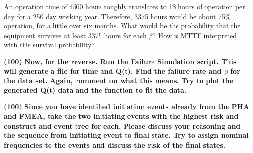 \documentclass[11pt,a4paper]{article}
\begin{document}
\begin{enumerate}[leftmargin=*,topsep=0pt,font=\bfseries]
{        \vspace{0.05in}
    \item[]
        An operation time of 4500 hours roughly translates to 18 hours of operation per day for a 250 day working year. Therefore, 3375 hours would be about 75\% operation, for a little over six months. What would be the probability that the equipment survives at least 3375 hours for each $\beta$? How is MTTF interpreted with this survival probability?}
        \vspace{\baselineskip}
        \newpage
    \item\textbf{(100) Now, for the reverse. Run the \href{https://github.com/TheDoctorRAB/education/tree/master/src}{Failure Simulation} script. This will generate a file for time and Q(t). Find the failure rate and $\beta$ for the data set. Again, comment on what this means. Try to plot the generated Q(t) data and the function to fit the data.}
        \vspace{\baselineskip}


























        \newpage
    \item\textbf{(100) Since you have identified initiating events already from the PHA and FMEA, take the two initiating events with the highest risk and construct and event tree for each. Please discuss your reasoning and the sequence from initiating event to final state.  Try to assign nominal frequencies to the events and discuss the risk of the final states.}
        \vspace{\baselineskip}
        
        
        
        
        
        
        
        
        
        
        
        
        
        
        
        
        
        
        

\end{enumerate}
\end{document}
